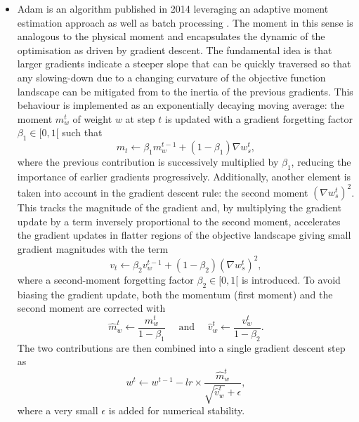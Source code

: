 \begin{itemize}[leftmargin=*]
    \item Adam is an algorithm published in 2014 leveraging an adaptive moment estimation approach as well as batch processing \cite{adamPaper}. The moment in this sense is analogous to the physical moment and encapsulates the dynamic of the optimisation as driven by gradient descent. The fundamental idea is that larger gradients indicate a steeper slope that can be quickly traversed so that any slowing-down due to a changing curvature of the objective function landscape can be mitigated from to the inertia of the previous gradients. This behaviour is implemented as an exponentially decaying moving average: the moment $m^t_w$ of weight $w$ at step $t$ is updated with a gradient forgetting factor $\beta_1 \in [0, 1[$ such that \[ m_t \leftarrow \beta_1 m^{t-1}_w + (1 - \beta_1) \nabla w_s^t,\] where the previous contribution is successively multiplied by $\beta_1$, reducing the importance of earlier gradients progressively. Additionally, another element is taken into account in the gradient descent rule: the second moment $(\nabla w_s^t)^2$. This tracks the magnitude of the gradient and, by multiplying the gradient update by a term inversely proportional to the second moment, accelerates the gradient updates in flatter regions of the objective landscape giving small gradient magnitudes with the term \[ v_t \leftarrow \beta_2 v^{t-1}_w + (1 - \beta_2) (\nabla w_s^t)^2,\] where a second-moment forgetting factor $\beta_2 \in [0, 1[$ is introduced. To avoid biasing the gradient update, both the momentum (first moment) and the second moment are corrected with \[\hat{m}^t_w \leftarrow \frac{m^t_w}{1 - \beta_1} \quad \text{ and } \quad  \hat{v}^t_w \leftarrow \frac{v^t_w}{1 - \beta_2}.\] The two contributions are then combined into a single gradient descent step as
    \begin{equation}\label{eq:adam}
        w^{t} \leftarrow w^{t-1} - lr \times \frac{\hat{m}^t_w}{\sqrt{\hat{v}^t_w} + \epsilon},
    \end{equation}
    where a very small $\epsilon$ is added for numerical stability.
\end{itemize}

